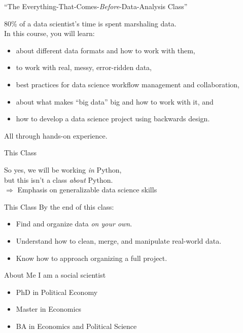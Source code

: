 \documentclass[11pt]{beamer}
\begin{document}
\begin{frame}[c]{``The Everything-That-Comes-\emph{Before}-Data-Analysis Class''}

\pause \alert{80\%} of a data scientist's time is spent marshaling data. \\

\pause In this course, you will learn:
\begin{itemize}
	\pause \item about different data formats and how to work with them,
	\pause \item to work with real, messy, error-ridden data,
	\pause \item best practices for data science workflow management and collaboration,
	\pause \item about what makes ``big data'' big and how to work with it, and
	\pause \item how to develop a data science project using backwards design.
\end{itemize}
\pause \alert{All} through hands-on experience.
\end{frame}

\begin{frame}[c]{This Class}

	So yes, we will be working \emph{in} Python, \\ 
\pause but this isn't a class \emph{about} Python. \\
\pause $\Rightarrow$ Emphasis on generalizable data science skills

\end{frame}

\begin{frame}[c]{This Class}
By the end of this class:
\begin{itemize}
	\pause \item Find and organize data \emph{on your own}.
	\pause \item Understand how to clean, merge, and manipulate real-world data.
	\pause \item Know how to approach organizing a full project.
\end{itemize}
\end{frame}


\begin{frame}[c]{About Me}
	I am a social scientist \\
	\vspace{0.5cm}
	\begin{itemize}
		\pause \item PhD in Political Economy
		\pause \item Master in Economics
		\pause \item BA in Economics and Political Science
	\end{itemize}
\end{frame}
\end{document}
